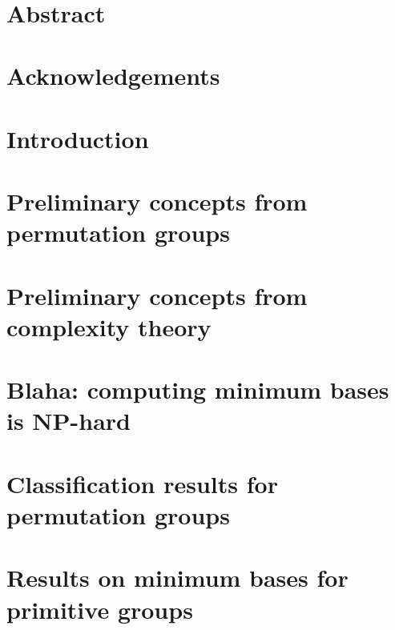 \documentclass[openany]{book}
\title{\textbf{\TITLE}}
\author{\textbf{\AUTHOR}}
\date{\textbf{\DATE}}
\begin{document}



\chapter*{Abstract}



\chapter*{Acknowledgements}



\tableofcontents

\chapter{Introduction}




\chapter{Preliminary concepts from permutation groups}



\chapter{Preliminary concepts from complexity theory}



\chapter{Blaha: computing minimum bases is NP-hard}



\chapter{Classification results for permutation groups}



\chapter{Results on minimum bases for primitive groups}



\renewcommand{\bibname}{References}

\appendix


\end{document}
